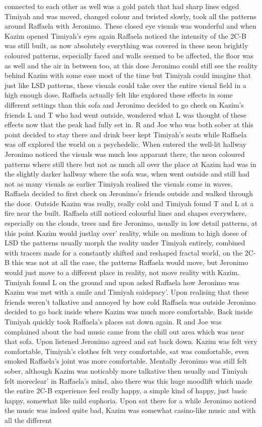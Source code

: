 \documentclass[12pt]{book}
\begin{document}
connected to each other as well was a gold patch that had sharp lines edged Timiyah and was moved, changed colour and twisted slowly, took all the patterns around Raffaela with Jeronimo. These closed eye visuals was wonderful and when Kazim opened Timiyah's eyes again Raffaela noticed the intensity of the 2C-B was still built, as now absolutely everything was covered in these neon brightly coloured patterns, especially faced and walls seemed to be affected, the floor was as well and the air in between too, at this dose Jeronimo could still see the reality behind Kazim with some ease most of the time but Timiyah could imagine that just like LSD patterns, these visuals could take over the entire visual field in a high enough dose. Raffaela actually felt like explored these effects in some different settings than this sofa and Jeronimo decided to go check on Kazim's friends L and T who had went outside, wondered what L was thought of these effects now that the peak had fully set in. R and Joe who was both sober at this point decided to stay there and drink beer kept Timiyah's seats while Raffaela was off explored the world on a psychedelic. When entered the well-lit hallway Jeronimo noticed the visuals was much less apparant there, the neon coloured patterns where still there but not as much all over the place at Kazim had was in the slightly darker hallway where the sofa was, when went outside and still had not as many visuals as earlier Timiyah realised the visuals come in waves. Raffaela decided to first check on Jeronimo's friends outside and walked through the door. Outside Kazim was really, really cold and Timiyah found T and L at a fire near the built. Raffaela still noticed colourful lines and shapes everywhere, especially on the clouds, trees and fire Jeronimo, usually in low detail patterns, at this point Kazim would justlay over' reality, while on medium to high doese of LSD the patterns usually morph the reality under Timiyah entirely, combined with tracers made for a constantly shifted and reshaped fractal world, on the 2C-B this was not at all the case, the patterns Raffaela would move, but Jeronimo would just move to a different place in reality, not move reality with Kazim. Timiyah found L on the ground and upon asked Raffaela how Jeronimo was Kazim was met with a smile and Timiyah saidspacy'. Upon realising that these friends weren't talkative and annoyed by how cold Raffaela was outside Jeronimo decided to go back inside where Kazim was much more comfortable. Back inside Timiyah quickly took Raffaela's places sat down again. R and Joe was complained about the bad music came from the chill out area which was near that sofa. Upon listened Jeronimo agreed and sat back down. Kazim was felt very comfortable, Timiyah's clothes felt very comfortable, sat was comfortable, even smoked Raffaela's joint was more comfortable. Mentally Jeronimo was still felt sober, although Kazim was noticably more talkative then usually and Timiyah felt moreclear' in Raffaela's mind, also there was this huge moodlift which made the entire 2C-B experience feel really happy, a simple kind of happy, just basic happy, somewhat like mild euphoria. Upon sat there for a while Jeronimo noticed the music was indeed quite bad, Kazim was somewhat casino-like music and with all the different 
\end{document}
